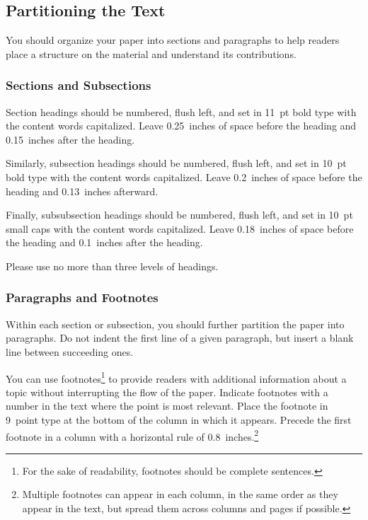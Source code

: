 \documentclass{article}
\begin{document}
\subsection{Partitioning the Text}

You should organize your paper into sections and paragraphs to help
readers place a structure on the material and understand its
contributions.

\subsubsection{Sections and Subsections}

Section headings should be numbered, flush left, and set in 11~pt bold
type with the content words capitalized. Leave 0.25~inches of space
before the heading and 0.15~inches after the heading.

Similarly, subsection headings should be numbered, flush left, and set
in 10~pt bold type with the content words capitalized. Leave
0.2~inches of space before the heading and 0.13~inches afterward.

Finally, subsubsection headings should be numbered, flush left, and
set in 10~pt small caps with the content words capitalized. Leave
0.18~inches of space before the heading and 0.1~inches after the
heading.

Please use no more than three levels of headings.

\subsubsection{Paragraphs and Footnotes}

Within each section or subsection, you should further partition the
paper into paragraphs. Do not indent the first line of a given
paragraph, but insert a blank line between succeeding ones.

You can use footnotes\footnote{For the sake of readability, footnotes
should be complete sentences.} to provide readers with additional
information about a topic without interrupting the flow of the paper.
Indicate footnotes with a number in the text where the point is most
relevant. Place the footnote in 9~point type at the bottom of the
column in which it appears. Precede the first footnote in a column
with a horizontal rule of 0.8~inches.\footnote{Multiple footnotes can
appear in each column, in the same order as they appear in the text,
but spread them across columns and pages if possible.}
\end{document}
